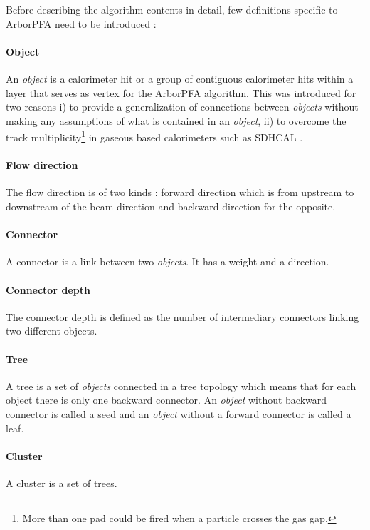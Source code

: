 \documentclass[cits]{JINST}
\begin{document}
Before describing the algorithm contents in detail, few definitions specific to ArborPFA need to be introduced :

\paragraph*{Object} An \textit{object} is a calorimeter hit or a group of contiguous calorimeter hits within a layer that serves as vertex for the ArborPFA algorithm. This was introduced for two reasons i) to provide a generalization of connections between \textit{objects} without making any assumptions of what is contained in an \textit{object}, ii) to overcome the track multiplicity\footnote{More than one pad could be fired when a particle crosses the gas gap.} in gaseous based calorimeters such as SDHCAL \cite{sdhcal-paper}.

\paragraph*{Flow direction} The flow direction is of two kinds : forward direction which is from upstream to downstream of the beam direction and backward direction for the opposite.

\paragraph*{Connector} A connector is a link between two \textit{objects}. It has a weight and a direction.

\paragraph*{Connector depth} The connector depth is defined as the number of intermediary connectors linking two different objects.

\paragraph*{Tree} A tree is a set of \textit{objects} connected in a tree topology which means that for each object there is only one backward connector. An \textit{object} without backward connector is called a seed and an \textit{object} without a forward connector is called a leaf.

\paragraph*{Cluster} A cluster is a set of trees.
\end{document}
